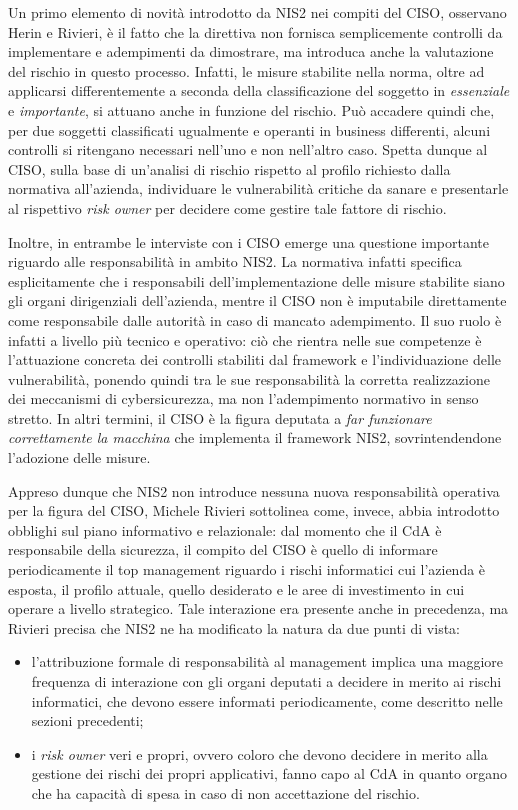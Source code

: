 Un primo elemento di novità introdotto da NIS2 nei compiti del CISO, osservano Herin e Rivieri, è il fatto
che la direttiva non fornisca semplicemente controlli da implementare e adempimenti
da dimostrare, ma introduca anche la valutazione del rischio in questo processo.
Infatti, le misure stabilite nella norma, oltre ad applicarsi differentemente a seconda
della classificazione del soggetto in \textit{essenziale} e \textit{importante},
si attuano anche in funzione del rischio. Può accadere quindi che, per due soggetti classificati
ugualmente e operanti in business differenti, alcuni controlli si ritengano
necessari nell'uno e non nell'altro caso. Spetta dunque al CISO, sulla base di un'analisi
di rischio rispetto al profilo richiesto dalla normativa all'azienda, individuare
le vulnerabilità critiche da sanare e presentarle al rispettivo \textit{risk owner}
per decidere come gestire tale fattore di rischio.

Inoltre, in entrambe le interviste con i CISO emerge una questione importante riguardo alle responsabilità in
ambito NIS2. La normativa infatti specifica esplicitamente che i responsabili
dell'implementazione delle misure stabilite siano gli organi dirigenziali dell'azienda,
mentre il CISO non è imputabile direttamente come responsabile dalle autorità
in caso di mancato adempimento. Il suo ruolo è infatti a livello più tecnico e operativo: 
ciò che rientra nelle sue competenze è l'attuazione concreta dei controlli
stabiliti dal framework e l'individuazione delle vulnerabilità, ponendo quindi 
tra le sue responsabilità la corretta realizzazione dei meccanismi di cybersicurezza, 
ma non l'adempimento normativo in senso stretto. In altri termini,
il CISO è la figura deputata a \textit{far funzionare correttamente la macchina} che 
implementa il framework NIS2, sovrintendendone l'adozione delle misure.

Appreso dunque che NIS2 non introduce nessuna nuova responsabilità operativa per la figura
del CISO, Michele Rivieri sottolinea come, invece, abbia introdotto obblighi sul piano informativo
e relazionale: dal momento che il CdA è responsabile della sicurezza, il compito del CISO
è quello di informare periodicamente il top management riguardo i rischi informatici cui 
l'azienda è esposta, il profilo attuale, quello desiderato e le aree di investimento in cui
operare a livello strategico. Tale interazione era presente anche in precedenza, ma Rivieri
precisa che NIS2 ne ha modificato la natura da due punti di vista:
\begin{itemize}
    \item l'attribuzione formale di responsabilità al management implica una maggiore frequenza
        di interazione con gli organi deputati a decidere in merito ai rischi informatici, che devono
        essere informati periodicamente, come descritto nelle sezioni precedenti;
    \item i \textit{risk owner} veri e propri, ovvero coloro che devono decidere in merito alla
        gestione dei rischi dei propri applicativi, fanno capo al CdA in quanto organo che ha capacità
        di spesa in caso di non accettazione del rischio.
\end{itemize}

